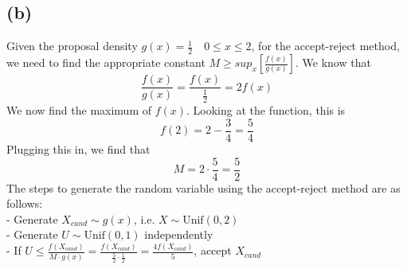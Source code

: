 \documentclass{article}
\begin{document}
{\subsection*{(b)}

Given the proposal density \(g(x) = \frac{1}{2} \quad 0 \leq x \leq 2\), for the accept-reject method, we need to find the appropriate constant \( M \geq sup_x[\frac{f(x)}{g(x)}]\). We know that 
\[
  \frac{f(x)}{g(x)} = \frac{f(x)}{\frac{1}{2}} = 2f(x)
\]
We now find the maximum of \(f(x)\). Looking at the function, this is 
\[
  f(2) = 2 - \frac{3}{4} = \frac{5}{4}
\]
Plugging this in, we find that 
\[
  M = 2 \cdot \frac{5}{4} = \frac{5}{2}
\]
The steps to generate the random variable using the accept-reject method are as follows: \\
- Generate \(X_{cand} \sim g(x)\), i.e. \(X \sim \text{Unif}(0, 2)\) \\
- Generate \(U \sim \text{Unif}(0, 1)\) independently \\
- If \(U \leq \frac{f(X_{cand})}{M \cdot g(x)} = \frac{f(X_{cand})}{\frac{5}{2} \cdot \frac{1}{2}} = \frac{4f(X_{cand})}{5}\), accept \(X_{cand}\)

}
\end{document}
